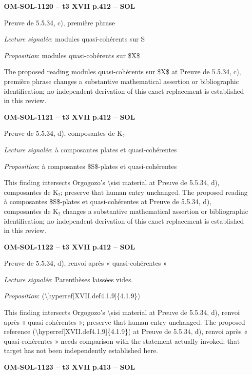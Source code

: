 \par\noindent\textbf{OM-SOL-1120 -- t3 XVII p.412 -- SOL}\par
Preuve de 5.5.34, c), première phrase\par
\emph{Lecture signalée}: modules quasi-cohérents sur S\par
\emph{Proposition}: modules quasi-cohérents sur \$X\$\par
The proposed reading modules quasi-cohérents sur \$X\$ at Preuve de 5.5.34, c), première phrase changes a substantive mathematical assertion or bibliographic identification; no independent derivation of this exact replacement is established in this review.\par
\par\noindent\textbf{OM-SOL-1121 -- t3 XVII p.412 -- SOL}\par
Preuve de 5.5.34, d), composantes de K₂\par
\emph{Lecture signalée}: à composantes plates et quasi-cohérentes\par
\emph{Proposition}: à composantes \$S\$-plates et quasi-cohérentes\par
This finding intersects Orgogozo's \textbackslash{}sisi material at Preuve de 5.5.34, d), composantes de K₂; preserve that human entry unchanged. The proposed reading à composantes \$S\$-plates et quasi-cohérentes at Preuve de 5.5.34, d), composantes de K₂ changes a substantive mathematical assertion or bibliographic identification; no independent derivation of this exact replacement is established in this review.\par
\par\noindent\textbf{OM-SOL-1122 -- t3 XVII p.412 -- SOL}\par
Preuve de 5.5.34, d), renvoi après « quasi-cohérentes »\par
\emph{Lecture signalée}: Parenthèses laissées vides.\par
\emph{Proposition}: (\textbackslash{}hyperref[XVII.def4.1.9]\{4.1.9\})\par
This finding intersects Orgogozo's \textbackslash{}sisi material at Preuve de 5.5.34, d), renvoi après « quasi-cohérentes »; preserve that human entry unchanged. The proposed reference (\textbackslash{}hyperref[XVII.def4.1.9]\{4.1.9\}) at Preuve de 5.5.34, d), renvoi après « quasi-cohérentes » needs comparison with the statement actually invoked; that target has not been independently established here.\par
\par\noindent\textbf{OM-SOL-1123 -- t3 XVII p.413 -- SOL}\par
